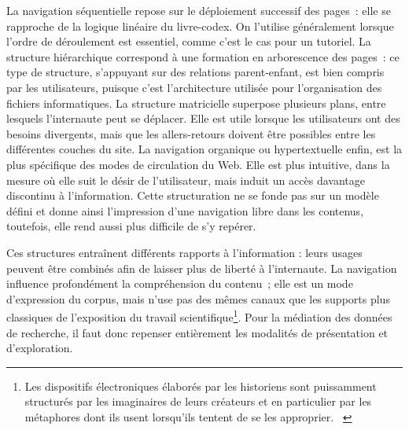 \documentclass[a4paper,12pt,twoside]{book}
\newcommand{\g}[1]{\og#1~\fg}
\begin{document}
La navigation séquentielle repose sur le déploiement successif des pages~: elle se rapproche de la logique linéaire du livre-codex.  On l'utilise généralement lorsque l'ordre de déroulement est essentiel, comme c'est le cas pour un tutoriel. La structure hiérarchique correspond à une formation en arborescence des pages~: ce type de structure, s'appuyant sur des relations parent-enfant, est bien compris par les utilisateurs, puisque c'est l'architecture utilisée pour l'organisation des fichiers informatiques. La structure matricielle superpose plusieurs plans, entre lesquels l'internaute peut se déplacer. Elle est utile lorsque les utilisateurs ont des besoins divergents, mais que les allers-retours doivent être possibles entre les différentes couches du site. La navigation organique ou hypertextuelle enfin, est la plus spécifique des modes de circulation du Web. Elle est plus intuitive, dans la mesure où elle suit le désir de l'utilisateur, mais induit un accès davantage discontinu à l'information. Cette structuration ne se fonde pas sur un modèle défini et donne ainsi l'impression d'une navigation libre dans les contenus, toutefois, elle rend aussi plus difficile de s'y repérer.

Ces structures entraînent différents rapports à l'information : leurs usages peuvent être combinés afin de laisser plus de liberté à l'internaute. La navigation influence profondément la compréhension du contenu~; elle est un mode d'expression du corpus, mais n'use pas des mêmes canaux que les supports plus classiques de l'exposition du travail scientifique\footnote{\g{Les dispositifs électroniques élaborés par les historiens sont puissamment structurés par les imaginaires de leurs créateurs et en particulier par les métaphores dont ils usent lorsqu’ils tentent de se les approprier. }\cite[§~14]{rygielOrdinateurReseauEcriture2006}}. Pour la médiation des données de recherche, il faut donc repenser entièrement les modalités de présentation et d'exploration.
\end{document}
